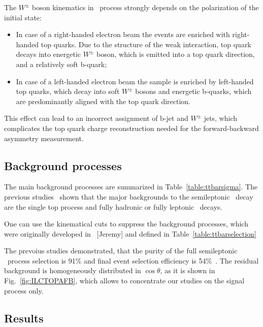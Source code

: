 The $W^\pm$ boson kinematics in \ttbar\ process strongly depends on the polarization of the initial state:
\begin{itemize}
	\item In case of a right-handed electron beam the events are enriched with right-handed top quarks. Due to the structure of the weak interaction, top quark decays into energetic $W^\pm$ boson, which is emitted into a top quark direction, and a relatively soft b-quark;
	\item In case of a left-handed electron beam the sample is enriched by left-handed top quarks, which decay into soft $W^\pm$ bosons and energetic b-quarks, which are predominantly aligned with the top quark direction. 
\end{itemize}
This effect can lead to an incorrect assignment of b-jet and $W^\pm$ jets, which complicates the top quark charge reconstruction needed for the forward-backward asymmetry measurement. 

\subsection{Background processes}
The main background processes are summarized in Table~\ref{table:ttbarsigma}. 
The previous studies~\cite{bib:ILCTOP}\cite{bib:Doublet} shown that the major backgrounds to the semileptonic \ttbar\ decay are the single top process and fully hadronic or fully leptonic \ttbar\ decays. 


One can use the kinematical cuts to suppress the background processes, which were originally developed in ~\cite{bib:Doublet}[Jeremy] and defined in Table~\ref{table:ttbarselection}

The prevoius studies demonstrated, that the purity of the full semileptonic \ttbar\ process selection is 91\% and final event selection efficiency is 54\%~\cite{bib:ILCTOP}.
The residual background is homogeneously distributed in $\cos\theta$, as it is shown in Fig.~\ref{fig:ILCTOPAFB}, which allows to concentrate our studies on the signal process only. 

\subsection{Results}

